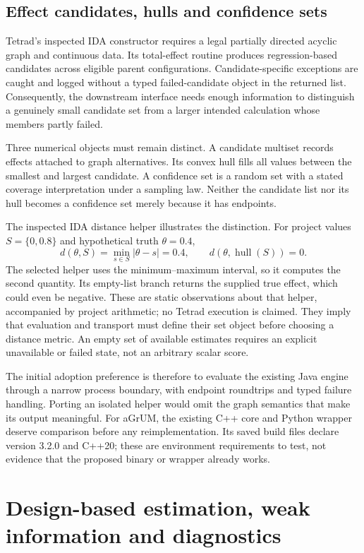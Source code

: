 \section{Effect candidates, hulls and confidence sets}

Tetrad's inspected IDA constructor requires a legal partially directed acyclic
graph and continuous data. Its total-effect routine produces regression-based
candidates across eligible parent configurations. Candidate-specific exceptions
are caught and logged without a typed failed-candidate object in the returned
list. Consequently, the downstream interface needs enough information to
distinguish a genuinely small candidate set from a larger intended calculation
whose members partly failed.\cite{tetrad}

Three numerical objects must remain distinct. A candidate multiset records
effects attached to graph alternatives. Its convex hull fills all values
between the smallest and largest candidate. A confidence set is a random set
with a stated coverage interpretation under a sampling law. Neither the
candidate list nor its hull becomes a confidence set merely because it has
endpoints.

The inspected IDA distance helper illustrates the distinction. For project
values \(S=\{0,0.8\}\) and hypothetical truth \(\theta=0.4\),
\[
 d(\theta,S)=\min_{s\in S}|\theta-s|=0.4,
 \qquad d(\theta,\operatorname{hull}(S))=0.
\]
The selected helper uses the minimum--maximum interval, so it computes the
second quantity. Its empty-list branch returns the supplied true effect, which
could even be negative. These are static observations about that helper,
accompanied by project arithmetic; no Tetrad execution is claimed. They imply
that evaluation and transport must define their set object before choosing a
distance metric. An empty set of available estimates requires an explicit
unavailable or failed state, not an arbitrary scalar score.\cite{tetrad}

The initial adoption preference is therefore to evaluate the existing Java
engine through a narrow process boundary, with endpoint roundtrips and typed
failure handling. Porting an isolated helper would omit the graph semantics
that make its output meaningful. For aGrUM, the existing C++ core and Python
wrapper deserve comparison before any reimplementation. Its saved build files
declare version 3.2.0 and C++20; these are environment requirements to test,
not evidence that the proposed binary or wrapper already works.

\chapter{Design-based estimation, weak information and diagnostics}
\label{sw:design}

